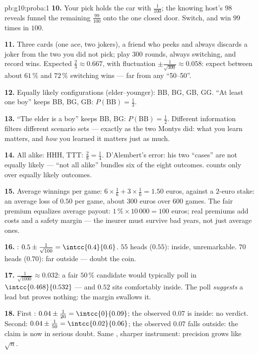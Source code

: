 \begin{solution}{pb:g10:proba:1}
\textbf{10.} Your pick holds the car with 
$\frac{1}{100}$; the knowing host's $98$ reveals funnel the
remaining $\frac{99}{100}$ onto the one closed door. Switch,
and win $99$ times in $100$.

\textbf{11.} Three cards (one ace, two jokers), a friend who
peeks and always discards a joker from the two you did not
pick; play $300$ rounds, always switching, and record wins.
Expected  $\frac23 \approx 0.667$, with fluctuation
$\pm\frac{1}{\sqrt{300}} \approx 0.058$: expect between about
$61\,\%$ and $72\,\%$ switching wins --- far from any
``50--50''.

\textbf{12.} Equally likely configurations (elder--younger):
BB, BG, GB, GG. ``At least one boy'' keeps BB, BG, GB:
$P(\text{BB}) = \frac13$.

\textbf{13.} ``The elder is a boy'' keeps BB, BG:
$P(\text{BB}) = \frac12$. Different information filters
different scenario sets --- exactly as the two Montys did: what
you learn matters, and \emph{how} you learned it matters just
as much.

\textbf{14.} All alike: HHH, TTT: $\frac28 = \frac14$.
D'Alembert's error: his two ``cases'' are not equally likely
--- ``not all alike'' bundles six of the eight outcomes.
 counts only over equally likely
outcomes.

\textbf{15.} Average winnings per game: $6 \times \frac16 + 3
\times \frac16 = 1.50$ euros, against a $2$-euro stake: an
average loss of $0.50$ per game, about $300$ euros over $600$
games. The fair premium equalizes average payout:
$1\,\% \times 10\,000 = 100$ euros; real premiums add costs
and a safety margin --- the insurer must survive bad years,
not just average ones.

\textbf{16.} : $0.5 \pm \frac{1}{\sqrt{100}} =
\intcc{0.4}{0.6}$. $55$ heads ($0.55$): inside, unremarkable.
$70$ heads ($0.70$): far outside --- doubt the coin.

\textbf{17.} $\frac{1}{\sqrt{1000}} \approx 0.032$: a fair
$50\,\%$ candidate would typically poll in
$\intcc{0.468}{0.532}$ --- and $0.52$ sits comfortably inside.
The poll \emph{suggests} a lead but proves nothing: the margin
swallows it.

\textbf{18.} First :  $0.04 \pm \frac{1}{20} =
\intcc{0}{0.09}$; the observed $0.07$ is inside: no verdict.
Second: $0.04 \pm \frac{1}{50} = \intcc{0.02}{0.06}$; the
observed $0.07$ falls outside: the claim is now in serious
doubt. Same , sharper instrument: precision grows like
$\sqrt n$.


\end{solution}
